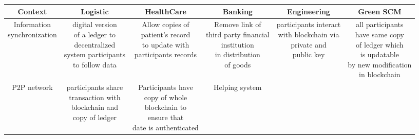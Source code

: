 \begin{table}[h!]
	\begin{center}
		\begin{adjustwidth}{-1cm}{}
			
			\begin{tabular} { c | c | c | c | c | c }
				
				\tiny \textbf{Context} &\tiny \textbf{Logistic}\cite{Tijan} & \tiny \textbf{HealthCare} & \tiny \textbf{Banking}\cite{Guo} & \tiny \textbf{Engineering}\cite{Kontantinos} & \tiny \textbf{Green SCM}\cite{Sarkis} \\
				\hline
				\tiny \makecell{Information\\ synchronization} & \tiny \makecell{digital version\\ of a ledger to\\ decentralized\\ system participants\\ to follow data} & \tiny \makecell {Allow copies of\\ patient's record\\ to update with \\participants records} & \tiny \makecell{Remove link of \\third party financial\\ institution\\ in distribution\\ of goods} & \tiny \makecell{participants interact\\ with blockchain via\\ private and\\ public key} & \tiny \makecell{all participants\\ have same copy\\ of ledger which\\ is updatable\\ by new modification \\in blockchain}\\ 
				\hline 
				\tiny P2P network   & \tiny \makecell{participants share \\transaction with\\ blockchain and\\ copy of ledger}& \tiny \makecell{Participants have \\copy of whole\\ blockchain to\\ ensure that \\date is authenticated} & \tiny \makecell{Helping system\\
}
\end{tabular}
\end{adjustwidth}
\end{center}
\end{table}
